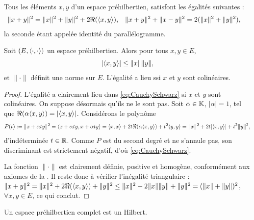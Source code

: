 Tous les éléments $x,y$ d'un espace préhilbertien, satisfont les égalités suivantes : 
\begin{align*}	
	\|x+y\|^2 &= \|x\|^2 + \|y\|^2 + 2 \Re(\langle x,y\rangle), &
	\|x+y\|^2 + \|x-y\|^2 &= 2 (\|x\|^2 + \|y\|^2),
\end{align*}
la seconde étant appelée identité du parallélogramme. 

\begin{proposition}
\label{prop:CauchySchwarz}
%
Soit $(E,\langle\cdot ,\cdot\rangle)$ un espace préhilbertien. Alors pour tous $x,y \in E$, 
\begin{equation}
\label{eq:CauchySchwarz}
	|\langle x,y\rangle| \leq \|x\| \|y\|, 
\end{equation}
et $\|\cdot\|$ définit une norme sur $E$. L'égalité a lieu ssi $x$ et $y$ sont colinéaires. 
\end{proposition}

\begin{proof}
	L'égalité a clairement lieu dans \eqref{eq:CauchySchwarz} si $x$ et $y$ sont colinéaires. On  suppose désormais qu'ils ne le sont pas. 
	Soit $\alpha\in \mathbb{K}$, $|\alpha|=1$, tel que $\Re(\alpha\langle x,y\rangle) = |\langle x,y\rangle|$.
	Considérons le polynôme %
	\begin{equation*}
		P(t) := \|x+\alpha t y\|^2 
		= \langle x+\alpha t y, x+\alpha t y\rangle
		= \langle x,x\rangle + 2 t \Re(\alpha\langle x,y\rangle)+ t^2\langle y,y\rangle 
		= \|x\|^2 + 2t|\langle x,y\rangle| + t^2\|y\|^2,
	\end{equation*}
	d'indéterminée $t \in \mathbb{R}$.
	Comme $P$ est du second degré et ne s'annule pas, son discriminant est strictement négatif, d'où \eqref{eq:CauchySchwarz}. 
	
	La fonction $\|\cdot\|$ est clairement définie, positive et homogène, conformément aux axiomes de la . Il reste donc à vérifier l'inégalité triangulaire : $\|x+y\|^2 = \|x\|^2 + 2\Re(\langle x,y\rangle) + \|y\|^2 \leq \|x\|^2 + 2 \|x\| \|y\| + \|y\|^2 = (\|x\|+\|y\|)^2$, $\forall x,y \in E$, ce qui conclut. 
\end{proof}

\begin{definition}[Hilbert]
\label{def:Hilbert}
%
Un espace préhilbertien complet est un Hilbert. 
\end{definition}

